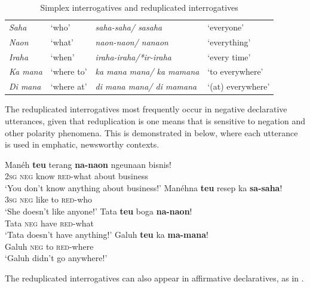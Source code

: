 \documentclass[output=paper]{langscibook}
\begin{document}
\begin{table}
    \centering
    \begin{tabular}{llll}
        \itshape Saha & ‘who’ & \itshape saha-saha/ sasaha & ‘everyone’\\        
        \itshape Naon & ‘what’ & \itshape naon-naon/ nanaon & ‘everything’\\        
        \itshape Iraha & ‘when’ & \itshape iraha-iraha/*ir-iraha & ‘every time’\\        
        \itshape Ka mana & ‘where to’ &\itshape  ka mana mana/ ka mamana & ‘to everywhere’\\        
        \itshape Di mana & ‘where at’ & \itshape di mana mana/ di mamana & ‘(at) everywhere’\\
    \end{tabular}
    \caption{Simplex interrogatives and reduplicated interrogatives}
    \label{tab:sun:1}
\end{table}

The reduplicated interrogatives most frequently occur in negative declarative utterances, given that reduplication is one means that is sensitive to negation and other polarity phenomena. This is demonstrated in  below, where each utterance is used in emphatic, newsworthy contexts. 

 \ea\label{ex:sun:38}
    \ea\label{ex:sun:38a}
        \gll  Manéh \textbf{teu} terang \textbf{na-naon} ngeunaan bisnis!\\ 
              2\textsc{sg} \textsc{neg} know \textsc{red}{}-what about business\\
        \glt ‘You don’t know anything about business!’
    \ex\label{ex:sun:38b}
        \gll  Manéhna \textbf{teu} resep ka \textbf{sa-saha}!\\
              3\textsc{sg} \textsc{neg} like to \textsc{red}{}-who\\
        \glt ‘She doesn’t like anyone!’
    \ex\label{ex:sun:38c}
        \gll  Tata \textbf{teu} boga \textbf{na-naon}!\\
              Tata \textsc{neg} have \textsc{red}{}-what\\
        \glt ‘Tata doesn’t have anything!’
    \ex\label{ex:sun:38d}
        \gll  Galuh \textbf{teu} ka \textbf{ma-mana}!\\
              Galuh \textsc{neg} to \textsc{red}{}-where\\
        \glt ‘Galuh didn’t go anywhere!’ \citep[172]{Butters2021}
    \z
\z 

 The reduplicated interrogatives can also appear in affirmative declaratives, as in . 
\end{document}
